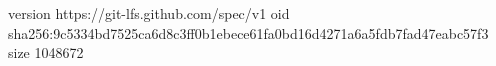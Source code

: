 version https://git-lfs.github.com/spec/v1
oid sha256:9c5334bd7525ca6d8c3ff0b1ebece61fa0bd16d4271a6a5fdb7fad47eabc57f3
size 1048672
